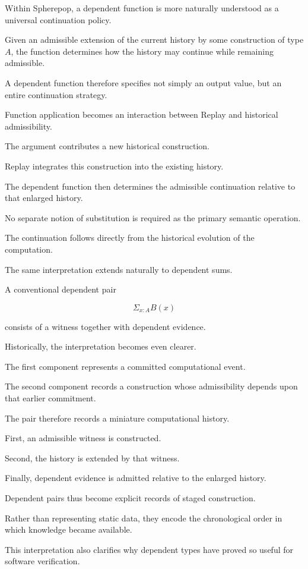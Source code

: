 \documentclass[12pt,oneside]{article}
\theoremstyle{definition}
\theoremstyle{remark}
\begin{document}
Within Spherepop, a dependent function is more naturally understood as a
universal continuation policy.

Given an admissible extension of the current history by some construction of
type \(A\), the function determines how the history may continue while
remaining admissible.

A dependent function therefore specifies not simply an output value, but an
entire continuation strategy.

Function application becomes an interaction between Replay and historical
admissibility.

The argument contributes a new historical construction.

Replay integrates this construction into the existing history.

The dependent function then determines the admissible continuation relative to
that enlarged history.

No separate notion of substitution is required as the primary semantic
operation.

The continuation follows directly from the historical evolution of the
computation.

The same interpretation extends naturally to dependent sums.

A conventional dependent pair

\[
\Sigma_{x:A} B(x)
\]

consists of a witness together with dependent evidence.

Historically, the interpretation becomes even clearer.

The first component represents a committed computational event.

The second component records a construction whose admissibility depends upon
that earlier commitment.

The pair therefore records a miniature computational history.

First, an admissible witness is constructed.

Second, the history is extended by that witness.

Finally, dependent evidence is admitted relative to the enlarged history.

Dependent pairs thus become explicit records of staged construction.

Rather than representing static data, they encode the chronological order in
which knowledge became available.

This interpretation also clarifies why dependent types have proved so useful
for software verification.
\end{document}
